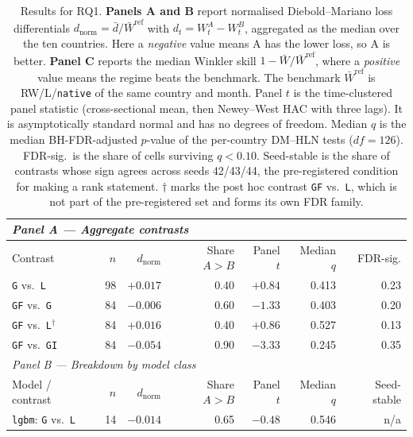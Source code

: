 \begin{table}[htbp]
  \centering\small
  \caption{Results for RQ1. \textbf{Panels A and B}
  report normalised Diebold--Mariano loss differentials
  $d_{\text{norm}}=\bar d/\bar W^{\text{ref}}$ with $d_t=W_t^{A}-W_t^{B}$,
  aggregated as the median over the ten countries. Here a \emph{negative} value
  means A has the lower loss, so A is better. \textbf{Panel C} reports
  the median Winkler skill $1-\bar W/\bar W^{\text{ref}}$, where a
  \emph{positive} value means the regime beats the benchmark. The benchmark $\bar W^{\text{ref}}$ is RW/L/\texttt{native}
  of the same country and month. Panel $t$ is the
  time-clustered panel statistic (cross-sectional mean, then Newey--West
  HAC with three lags). It is asymptotically standard normal and has no
  degrees of freedom. Median $q$ is the median BH-FDR-adjusted $p$-value
  of the per-country DM--HLN tests ($df=126$). FDR-sig.\ is the share of
  cells surviving $q<0.10$. Seed-stable is the share of contrasts whose
  sign agrees across seeds 42/43/44, the pre-registered condition for
  making a rank statement. $\dagger$ marks the post hoc contrast
  \texttt{GF} vs.\ \texttt{L}, which is not part of the pre-registered
  set and forms its own FDR family.}
  \label{tab:rq1_results}
  \begin{tabular}{lrrrrrr}
    \toprule
    \multicolumn{7}{l}{\emph{Panel A --- Aggregate contrasts}} \\
    \midrule
    Contrast & $n$ & $d_{\text{norm}}$ & Share $A\!>\!B$ & Panel $t$ & Median $q$ & FDR-sig. \\
    \midrule
    \texttt{G} vs.\ \texttt{L}                & 98 & $+0.017$ & 0.40 & $+0.84$ & 0.413 & 0.23 \\
    \texttt{GF} vs.\ \texttt{G}               & 84 & $-0.006$ & 0.60 & $-1.33$ & 0.403 & 0.20 \\
    \texttt{GF} vs.\ \texttt{L}$^\dagger$     & 84 & $+0.016$ & 0.40 & $+0.86$ & 0.527 & 0.13 \\
    \texttt{GF} vs.\ \texttt{GI}              & 84 & $-0.054$ & 0.90 & $-3.33$ & 0.245 & 0.35 \\
    \midrule
    \multicolumn{7}{l}{\emph{Panel B --- Breakdown by model class}} \\
    \midrule
    Model / contrast & $n$ & $d_{\text{norm}}$ & Share $A\!>\!B$ & Panel $t$ & Median $q$ & Seed-stable \\
    \midrule
    \texttt{lgbm}: \texttt{G} vs.\ \texttt{L}                & 14 & $-0.014$ & 0.65 & $-0.48$ & 0.546 & n/a \\

\end{tabular}
\end{table}
